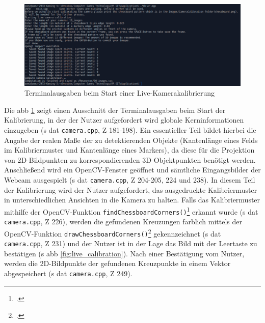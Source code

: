 \begin{figure}[H]
\centering
\includegraphics[width=15cm]{Bilder/Implementierung/terminal_logs2.png}
\caption{Terminalausgaben beim Start einer Live-Kamerakalibrierung}
\label{fig:startTerminalkali}
\end{figure}

\noindent Die \acs{abb} \ref{fig:startTerminalkali} zeigt einen Ausschnitt der Terminalausgaben beim Start der Kalibrierung, in der der Nutzer aufgefordert wird globale Kerninformationen einzugeben (\acs{s} \acs{dat} \texttt{camera.cpp}, \acs{Z} 181-198). Ein essentieller Teil bildet hierbei die Angabe der realen Maße der zu detektierenden Objekte (Kantenlänge eines Felds im Kalibriermuster und Kantenlänge eines Markers), da diese für die Projektion von 2D-Bildpunkten zu korrespondierenden 3D-Objektpunkten benötigt werden. Anschließend wird ein OpenCV-Fenster geöffnet und sämtliche Eingangsbilder der Webcam ausgespielt (\acs{s} \acs{dat} \texttt{camera.cpp}, \acs{Z} 204-205, 224 und 238). In diesem Teil der Kalibrierung wird der Nutzer aufgefordert, das ausgedruckte Kalibriermuster in unterschiedlichen Ansichten in die Kamera zu halten. Falls das Kalibriermuster mithilfe der OpenCV-Funktion \texttt{findChessboardCorners()}\footcite{opencvfindChessboardCorners} erkannt wurde (\acs{s} \acs{dat} \texttt{camera.cpp}, \acs{Z} 226), werden die gefundenen Kreuzungen farblich mittels der OpenCV-Funktion \texttt{drawChessboardCorners()}\footcite{opencvdrawChessboardCorners} gekennzeichnet (\acs{s} \acs{dat} \texttt{camera.cpp}, \acs{Z} 231) und der Nutzer ist in der Lage das Bild mit der Leertaste zu bestätigen (\acs{s} \acs{abb} \ref{fig:live_calibration}). Nach einer Bestätigung vom Nutzer, werden die 2D-Bildpunkte der gefundenen Kreuzpunkte in einem Vektor abgespeichert (\acs{s} \acs{dat} \texttt{camera.cpp}, \acs{Z} 249).

